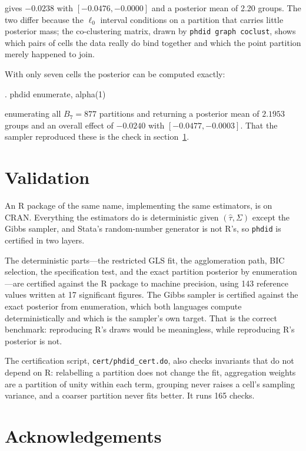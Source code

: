 \documentclass{sj}
\begin{document}
gives $-0.0238$ with $[-0.0476, -0.0000]$ and a posterior mean of 2.20 groups.
The two differ because the $\ell_0$ interval conditions on a partition that
carries little posterior mass; the co-clustering matrix, drawn by
\texttt{phdid graph coclust}, shows which pairs of cells the data really do
bind together and which the point partition merely happened to join.

With only seven cells the posterior can be computed exactly:

\begin{stlog}
. phdid enumerate, alpha(1)
\end{stlog}

enumerating all $B_7 = 877$ partitions and returning a posterior mean of
$2.1953$ groups and an overall effect of $-0.0240$ with $[-0.0477, -0.0003]$.
That the sampler reproduced these is the check in section~\ref{sec:valid}.

\section{Validation}
\label{sec:valid}

An R package of the same name, implementing the same estimators, is on CRAN.
Everything the estimators do is deterministic given $(\hat\tau, \Sigma)$
except the Gibbs sampler, and Stata's random-number generator is not R's, so
\texttt{phdid} is certified in two layers.

The deterministic parts---the restricted GLS fit, the agglomeration path, BIC
selection, the specification test, and the exact partition posterior by
enumeration---are certified against the R package to machine precision, using
143 reference values written at 17 significant figures.  The Gibbs sampler is
certified against the exact posterior from enumeration, which both languages
compute deterministically and which is the sampler's own target.  That is the
correct benchmark: reproducing R's draws would be meaningless, while
reproducing R's posterior is not.

The certification script, \texttt{cert/phdid\_cert.do}, also checks invariants
that do not depend on R: relabelling a partition does not change the fit,
aggregation weights are a partition of unity within each term, grouping never
raises a cell's sampling variance, and a coarser partition never fits better.
It runs 165 checks.

\section{Acknowledgements}
\end{document}

